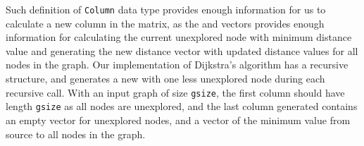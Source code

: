Such definition of \texttt{Column} data type provides enough information for us to calculate a new column in the matrix, as the  and  vectors provides enough information for calculating the current unexplored node with minimum distance value and generating the new distance vector with updated distance values for all nodes in the graph. Our implementation of Dijkstra's algorithm has a recursive structure, and generates a new  with one less unexplored node during each recursive call. With an input graph of size \texttt{gsize}, the first column should have length \texttt{gsize} as all nodes are unexplored, and the last column generated contains an empty vector for unexplored nodes, and a vector of the minimum value from source to all nodes in the graph. 
